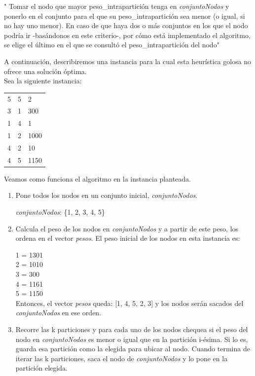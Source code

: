 " Tomar el nodo que mayor peso\_intrapartición tenga en \textit{conjuntoNodos} y ponerlo en el conjunto para el que su peso\_intrapartición sea menor (o igual, si no hay uno menor). En caso de que haya dos o más conjuntos en los que el nodo podría ir -basándonos en este criterio-, por cómo está implementado el algoritmo, se elige el último en el que se consultó el peso\_intrapartición del nodo"


A continuación, describiremos una instancia para la cual esta heurística golosa no ofrece una solución óptima.\\

Sea la siguiente instancia:\\

	\begin{tabular}{| l | l | l |}
	\hline
	5 & 5 & 2\\
	3 & 1 & 300\\
	1 & 4 & 1\\
	1 & 2 & 1000\\
	4 & 2 & 10\\
	4 & 5 & 1150\\

	\hline
	\end{tabular}

Veamos como funciona el algoritmo en la instancia planteada. \\

\begin{enumerate}
\item Pone todos los nodos en un conjunto inicial, \textit{conjuntoNodos}.

\textit{conjuntoNodos}: \{1, 2, 3, 4, 5\}

\item Calcula el peso de los nodos en \textit{conjuntoNodos} y a partir de este peso, los ordena en el vector \textit{pesos}. El peso inicial de los nodos en esta instancia es:

1 = 1301\\
2 = 1010\\
3 = 300\\
4 = 1161\\
5 = 1150\\

Entonces, el vector \textit{pesos} queda: [1, 4, 5, 2, 3] y los nodos serán sacados del \textit{conjuntoNodos} en ese orden.\\

\item Recorre las k particiones y para cada uno de los nodos chequea si el peso del nodo en \textit{conjuntoNodos} es menor o igual que en la partición i-ésima. Si lo es, guarda esa partición como la elegida para ubicar al nodo. Cuando termina de iterar las k particiones, saca el nodo de \textit{conjuntoNodos} y lo pone en la partición elegida.
\end{enumerate}


